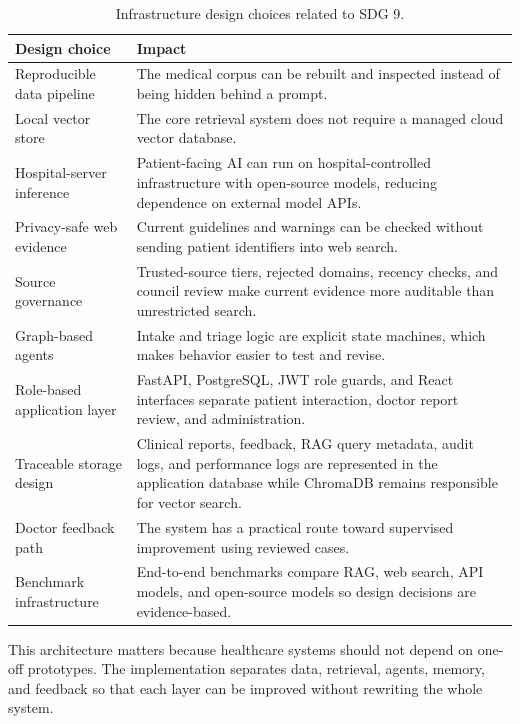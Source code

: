 \begin{table}[htbp]
\centering
\caption{Infrastructure design choices related to SDG 9.}
\label{tab:sdg9_infrastructure}
\begin{tabular}{p{} p{}}
\toprule
\textbf{Design choice} & \textbf{Impact}\\
\midrule
Reproducible data pipeline & The medical corpus can be rebuilt and inspected instead of being hidden behind a prompt.\\
Local vector store & The core retrieval system does not require a managed cloud vector database.\\
Hospital-server inference & Patient-facing AI can run on hospital-controlled infrastructure with open-source models, reducing dependence on external model APIs.\\
Privacy-safe web evidence & Current guidelines and warnings can be checked without sending patient identifiers into web search.\\
Source governance & Trusted-source tiers, rejected domains, recency checks, and council review make current evidence more auditable than unrestricted search.\\
Graph-based agents & Intake and triage logic are explicit state machines, which makes behavior easier to test and revise.\\
Role-based application layer & FastAPI, PostgreSQL, JWT role guards, and React interfaces separate patient interaction, doctor report review, and administration.\\
Traceable storage design & Clinical reports, feedback, RAG query metadata, audit logs, and performance logs are represented in the application database while ChromaDB remains responsible for vector search.\\
Doctor feedback path & The system has a practical route toward supervised improvement using reviewed cases.\\
Benchmark infrastructure & End-to-end benchmarks compare RAG, web search, API models, and open-source models so design decisions are evidence-based.\\
\bottomrule
\end{tabular}
\end{table}

This architecture matters because healthcare systems should not depend on one-off prototypes. The implementation separates data, retrieval, agents, memory, and feedback so that each layer can be improved without rewriting the whole system.

